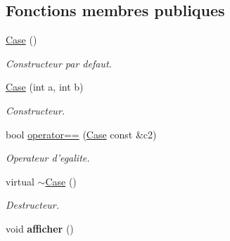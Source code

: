 \subsection*{\-Fonctions membres publiques}
\begin{DoxyCompactItemize}
\item 
\hypertarget{classCase_a14237e17aab1829965adab76b747db6c}{\hyperlink{classCase_a14237e17aab1829965adab76b747db6c}{\-Case} ()}\label{classCase_a14237e17aab1829965adab76b747db6c}

\begin{DoxyCompactList}\small\item\em \-Constructeur par defaut. \end{DoxyCompactList}\item 
\hyperlink{classCase_ad61be010b8d3cc841706c989c08aaaac}{\-Case} (int a, int b)
\begin{DoxyCompactList}\small\item\em \-Constructeur. \end{DoxyCompactList}\item 
bool \hyperlink{classCase_aba81e8660bf4009cc0ddee8e132bce49}{operator==} (\hyperlink{classCase}{\-Case} const \&c2)
\begin{DoxyCompactList}\small\item\em \-Operateur d'egalite. \end{DoxyCompactList}\item 
\hypertarget{classCase_ab004564aae3e15db0c7fd5dde0b4c379}{virtual \hyperlink{classCase_ab004564aae3e15db0c7fd5dde0b4c379}{$\sim$\-Case} ()}\label{classCase_ab004564aae3e15db0c7fd5dde0b4c379}

\begin{DoxyCompactList}\small\item\em \-Destructeur. \end{DoxyCompactList}\item 
\hypertarget{classCase_ad3faa1f96e315587b4fb70de225a8b80}{void {\bfseries afficher} ()}\label{classCase_ad3faa1f96e315587b4fb70de225a8b80}


\end{DoxyCompactItemize}
